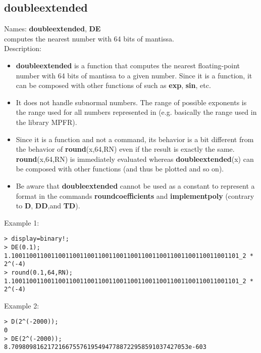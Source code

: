 \subsection{doubleextended}
\label{labdoubleextended}
\noindent Names: \textbf{doubleextended}, \textbf{DE}\\
computes the nearest number with 64 bits of mantissa.\\
\noindent Description: \begin{itemize}

\item \textbf{doubleextended} is a function that computes the nearest floating-point number with
   64 bits of mantissa to a given number. Since it is a function, it can be
   composed with other functions of \sollya such as \textbf{exp}, \textbf{sin}, etc.

\item It does not handle subnormal numbers. The range of possible exponents is the 
   range used for all numbers represented in \sollya (e.g. basically the range 
   used in the library MPFR).

\item Since it is a function and not a command, its behavior is a bit different from 
   the behavior of \textbf{round}(x,64,RN) even if the result is exactly the same.
   \textbf{round}(x,64,RN) is immediately evaluated whereas \textbf{doubleextended}(x) can be composed 
   with other functions (and thus be plotted and so on).

\item Be aware that \textbf{doubleextended} cannot be used as a constant to represent a format in the
   commands \textbf{roundcoefficients} and \textbf{implementpoly} (contrary to \textbf{D}, \textbf{DD},and \textbf{TD}).
\end{itemize}
\noindent Example 1: 
\begin{center}\begin{minipage}{15cm}\begin{Verbatim}[frame=single]
> display=binary!;
> DE(0.1);
1.100110011001100110011001100110011001100110011001100110011001101_2 * 2^(-4)
> round(0.1,64,RN);
1.100110011001100110011001100110011001100110011001100110011001101_2 * 2^(-4)
\end{Verbatim}
\end{minipage}\end{center}
\noindent Example 2: 
\begin{center}\begin{minipage}{15cm}\begin{Verbatim}[frame=single]
> D(2^(-2000));
0
> DE(2^(-2000));
8.7098098162172166755761954947788722958591037427053e-603
\end{Verbatim}
\end{minipage}\end{center}

